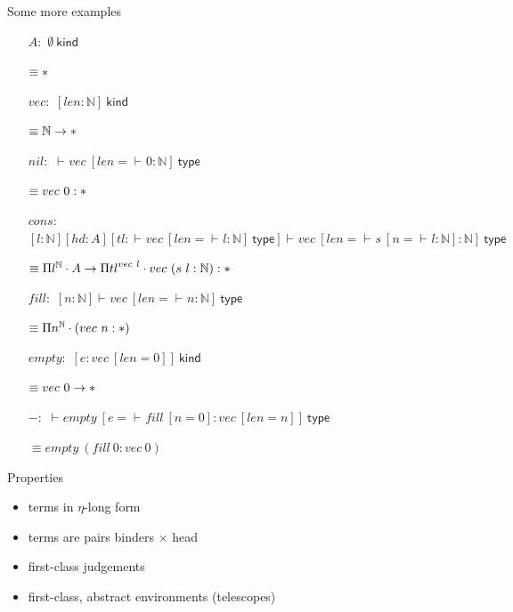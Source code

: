 \documentclass[ignorenonframetext,red]{beamer}
\newcommand\postbinder{\cdot}
\newcommand\prd[2]{\ensuremath\Pi{#1}^{#2}\postbinder}
\newcommand\app[1]{{#1}\ }
\newcommand\srt[1]{\ensuremath\mathsf{#1}}
\newcommand\type{\srt *}
\newcommand\eent[1]{\left[{#1}\right]}
\newcommand\econs[2]{{#1}\eent{#2}}
\newcommand\esing[1]{\econs{}{#1}}
\newcommand\jlangt[4]{{#2}\vdash_{\mathrm{#1}}{#3}:{#4}}
\newcommand\jlangA[3]{{#2}\vdash_{\mathrm{#1}}{#3}\mathsf{\ type}}
\newcommand\jlangK[3]{{#2}\vdash_{\mathrm{#1}}{#3}\mathsf{\ kind}}
\newcommand\jnlft[3]{\jlangt{}{#1}{#2}{#3}}
\newcommand\jnlfA[2]{\jlangA{}{#1}{#2}}
\newcommand\jnlfK[1]{{#1}\ \mathsf{kind}} %
\newcommand\nat{\mathbb N}
\newenvironment{smallright}{
  \begin{flushright}
    \footnotesize
  }{
  \end{flushright}
}
\begin{document}
\begin{frame}{Some more examples}
  \begin{enumerate}
  \item[$A:$] $\jnlfK\emptyset$
    \begin{smallright}
      $\equiv \type$
    \end{smallright}
  \item[$vec:$]
    $\jnlfK{\esing{len:\nat}}$
    \begin{smallright}
      $\equiv \nat\to\type$
    \end{smallright}
  \item[$nil:$]
    $\jnlfA{}{\app{vec}\esing{len=\jnlft{}{0}{\nat}}}$
    \begin{smallright}
      \footnotesize $\equiv \app{vec} 0 : \type$
    \end{smallright}
  \item[$cons:$]
    $\jnlfA { \econs{ \econs{ \esing{l:\nat}} {hd:A}}
      {tl:\jnlfA{}{ \app {vec} {\esing{len=\jnlft{}{l}{\nat}}}}}}
    {\app{vec} {\esing{len =\jnlft{}{\app s {\esing{n =
                \jnlft{}{l}{\nat}}}}{\nat}}}}$
    \begin{smallright}
      $\equiv \prd l \nat A\to \prd {tl} {\app {vec} l}
      \app {vec} (\app s l : \nat) : \type$
    \end{smallright}
  \item[$fill:$]
    $\jnlfA{\esing{n:\nat}}{\app{vec}{\esing{len=\jnlft{}{n}{\nat}}}}$
    \begin{smallright}
      $\equiv \prd n \nat (\app{vec} n : \type)$
    \end{smallright}
  \item[$empty:$]
    $\jnlfK{\esing{e:\app{vec}\esing{len=0}}}$
    \begin{smallright}
      $\equiv \app{vec} 0\to \type$
    \end{smallright}
  \item[$-:$]
    $\jnlfA{}{\app{empty}\esing{e=\jnlft{}{\app{fill}\esing{n=0}}{\app{vec}\esing{len=n}}}}$
    \begin{smallright}
      $\equiv \app{empty}(\app{fill} 0 : \app{vec} 0)$
    \end{smallright}
  \end{enumerate}
\end{frame}

\begin{frame}{Properties}
  \begin{itemize}
  \item terms in $\eta$-long form
  \item terms are pairs binders $\times$ head
  \item first-class judgements
  \item first-class, abstract environments (telescopes)
  \end{itemize}
\end{frame}
\end{document}
